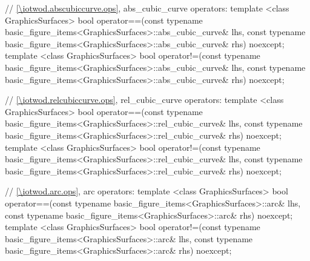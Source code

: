 \begin{codeblock}
{  // \ref{\iotwod.abscubiccurve.ops}, abs_cubic_curve operators:
  template <class GraphicsSurfaces>
  bool operator==(const typename 
    basic_figure_items<GraphicsSurfaces>::abs_cubic_curve& lhs,
    const typename basic_figure_items<GraphicsSurfaces>::abs_cubic_curve& rhs) 
    noexcept;
  template <class GraphicsSurfaces>
  bool operator!=(const typename 
    basic_figure_items<GraphicsSurfaces>::abs_cubic_curve& lhs,
    const typename basic_figure_items<GraphicsSurfaces>::abs_cubic_curve& rhs) 
    noexcept;

  // \ref{\iotwod.relcubiccurve.ops}, rel_cubic_curve operators:
  template <class GraphicsSurfaces>
  bool operator==(const typename 
    basic_figure_items<GraphicsSurfaces>::rel_cubic_curve& lhs,
    const typename basic_figure_items<GraphicsSurfaces>::rel_cubic_curve& rhs) 
    noexcept;
  template <class GraphicsSurfaces>
  bool operator!=(const typename 
    basic_figure_items<GraphicsSurfaces>::rel_cubic_curve& lhs,
    const typename basic_figure_items<GraphicsSurfaces>::rel_cubic_curve& rhs) 
    noexcept;

  // \ref{\iotwod.arc.ops}, arc operators:
  template <class GraphicsSurfaces>
  bool operator==(const typename basic_figure_items<GraphicsSurfaces>::arc& lhs,
    const typename basic_figure_items<GraphicsSurfaces>::arc& rhs) noexcept;
  template <class GraphicsSurfaces>
  bool operator!=(const typename basic_figure_items<GraphicsSurfaces>::arc& lhs,
    const typename basic_figure_items<GraphicsSurfaces>::arc& rhs) noexcept;
}
\end{codeblock}